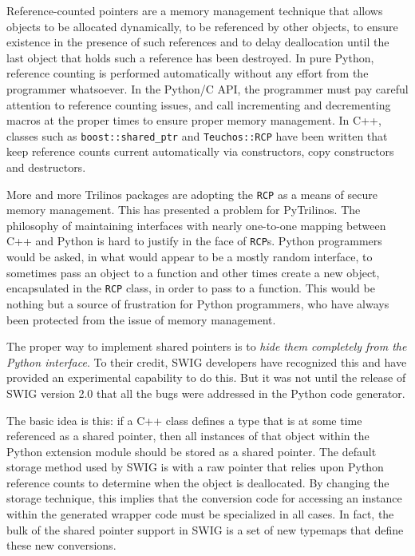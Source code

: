 \documentclass[11pt]{article}
\begin{document}
Reference-counted pointers are a memory management technique that allows objects to be allocated dynamically, to be referenced by other objects, to ensure existence in the presence of such references and to delay deallocation until the last object that holds such a reference has been destroyed.  In pure Python, reference counting is performed automatically without any effort from the programmer whatsoever.  In the Python/C API, the programmer must pay careful attention to reference counting issues, and call incrementing and decrementing macros at the proper times to ensure proper memory management.  In C++, classes such as {\tt boost::shared\_ptr} and {\tt Teuchos::RCP} have been written that keep reference counts current automatically via constructors, copy constructors and destructors.

More and more Trilinos packages are adopting the {\tt RCP} as a means of secure memory management.  This has presented a problem for PyTrilinos.  The philosophy of maintaining interfaces with nearly one-to-one mapping between C++ and Python is hard to justify in the face of {\tt RCP}s.  Python programmers would be asked, in what would appear to be a mostly random interface, to sometimes pass an object to a function and other times create a new object, encapsulated in the {\tt RCP} class, in order to pass to a function.  This would be nothing but a source of frustration for Python programmers, who have always been protected from the issue of memory management.

The proper way to implement shared pointers is to {\em hide them completely from the Python interface}.  To their credit, SWIG developers have recognized this and have provided an experimental capability to do this.  But it was not until the release of SWIG version 2.0 that all the bugs were addressed in the Python code generator.

The basic idea is this: if a C++ class defines a type that is at some time referenced as a shared pointer, then all instances of that object within the Python extension module should be stored as a shared pointer.  The default storage method used by SWIG is with a raw pointer that relies upon Python reference counts to determine when the object is deallocated.  By changing the storage technique, this implies that the conversion code for accessing an instance within the generated wrapper code must be specialized in all cases.  In fact, the bulk of the shared pointer support in SWIG is a set of new typemaps that define these new conversions.
\end{document}
